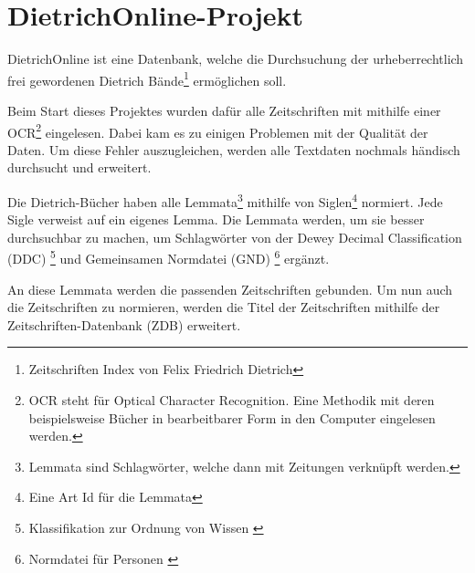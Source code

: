 \chapter{DietrichOnline-Projekt}
\label{dietrichonline}

DietrichOnline ist eine Datenbank, welche die Durchsuchung der urheberrechtlich frei gewordenen Dietrich Bände\footnote{Zeitschriften Index von Felix Friedrich Dietrich} ermöglichen soll.

Beim Start dieses Projektes wurden dafür alle Zeitschriften mit mithilfe einer OCR\footnote{OCR steht für Optical Character Recognition. Eine Methodik mit deren beispielsweise Bücher in bearbeitbarer Form in den Computer eingelesen werden.} eingelesen. Dabei kam es zu einigen Problemen mit der Qualität der Daten. Um diese Fehler auszugleichen, werden alle Textdaten nochmals händisch durchsucht und erweitert.

Die Dietrich-Bücher haben alle Lemmata\footnote{Lemmata sind Schlagwörter, welche dann mit Zeitungen verknüpft werden.} mithilfe von Siglen\footnote{Eine Art Id für die Lemmata} normiert. Jede Sigle verweist auf ein eigenes Lemma. Die Lemmata werden, um sie besser durchsuchbar zu machen, um Schlagwörter von der Dewey Decimal Classification (DDC)  \footnote{Klassifikation zur Ordnung von Wissen \cite{DeutscheNationalBibliothek.ddc}} und Gemeinsamen Normdatei (GND)  \footnote{Normdatei für Personen \cite{DeutscheNationalBibliothek.2019b}} ergänzt.

An diese Lemmata werden die passenden Zeitschriften gebunden. Um nun auch die Zeitschriften zu normieren, werden die Titel der Zeitschriften mithilfe der Zeitschriften-Datenbank (ZDB) erweitert. \cite{UniversityofTrier.2016}